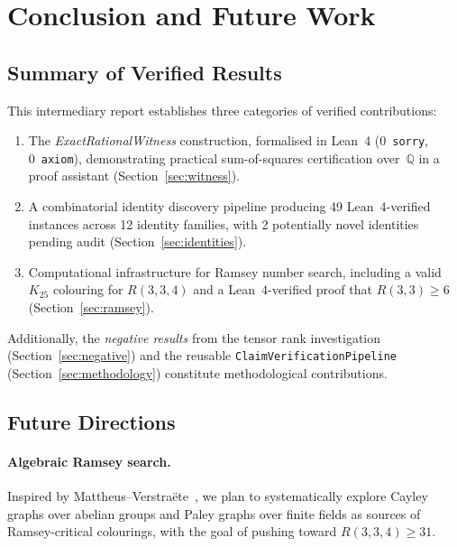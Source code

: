 \documentclass[11pt,a4paper]{article}
\begin{document}
\section{Conclusion and Future Work}\label{sec:conclusion}

\subsection{Summary of Verified Results}

This intermediary report establishes three categories of verified
contributions:
\begin{enumerate}
  \item The \emph{ExactRationalWitness} construction, formalised in Lean~4
    (0~\texttt{sorry}, 0~\texttt{axiom}), demonstrating practical
    sum-of-squares certification over~$\mathbb{Q}$ in a proof assistant
    (Section~\ref{sec:witness}).

  \item A combinatorial identity discovery pipeline producing 49 Lean~4-verified
    instances across 12 identity families, with 2 potentially novel identities
    pending audit (Section~\ref{sec:identities}).

  \item Computational infrastructure for Ramsey number search, including a
    valid $K_{25}$ colouring for $R(3,3,4)$ and a Lean~4-verified proof that
    $R(3,3) \geq 6$ (Section~\ref{sec:ramsey}).
\end{enumerate}

\noindent Additionally, the \emph{negative results} from the tensor rank
investigation (Section~\ref{sec:negative}) and the reusable
\texttt{ClaimVerificationPipeline} (Section~\ref{sec:methodology}) constitute
methodological contributions.

\subsection{Future Directions}

\paragraph{Algebraic Ramsey search.}
Inspired by Mattheus--Verstraëte~\cite{mattheus2024}, we plan to
systematically explore Cayley graphs over abelian groups and Paley graphs
over finite fields as sources of Ramsey-critical colourings, with the goal of
pushing toward $R(3,3,4) \geq 31$.
\end{document}
